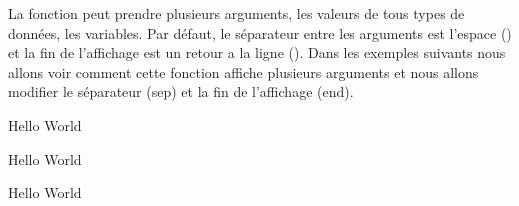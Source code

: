 \documentclass[letterpaper,10pt,french]{sphinxmanual}
\begin{document}
\sphinxAtStartPar
La fonction  peut prendre plusieurs arguments, les valeurs de tous types de données, les variables. Par défaut, le séparateur entre les arguments est l’espace () et la fin de l’affichage est un retour a la ligne (). Dans les exemples suivants nous allons voir comment cette fonction affiche plusieurs arguments et nous allons modifier le séparateur (sep) et la fin de l’affichage (end).

\begin{sphinxVerbatim}[commandchars=\\\{\}]
\end{sphinxVerbatim}

\begin{sphinxVerbatim}[commandchars=\\\{\}]
Hello
World
\end{sphinxVerbatim}

\begin{sphinxVerbatim}[commandchars=\\\{\}]
\end{sphinxVerbatim}

\begin{sphinxVerbatim}[commandchars=\\\{\}]
Hello World
\end{sphinxVerbatim}

\begin{sphinxVerbatim}[commandchars=\\\{\}]
     
\end{sphinxVerbatim}

\begin{sphinxVerbatim}[commandchars=\\\{\}]
Hello World
\end{sphinxVerbatim}
\end{document}
